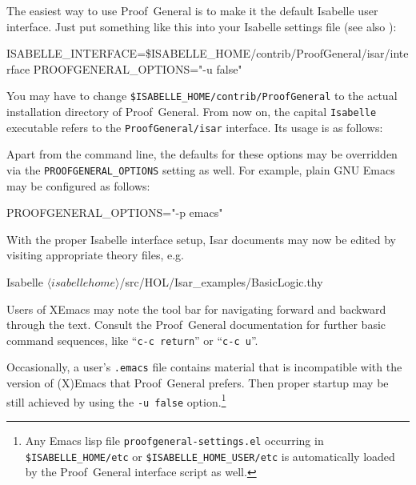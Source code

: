 The easiest way to use Proof~General is to make it the default Isabelle user
interface.  Just put something like this into your Isabelle settings file (see
also \cite{isabelle-sys}):
\begin{ttbox}
ISABELLE_INTERFACE=\$ISABELLE_HOME/contrib/ProofGeneral/isar/interface
PROOFGENERAL_OPTIONS="-u false"
\end{ttbox}
You may have to change \texttt{\$ISABELLE_HOME/contrib/ProofGeneral} to the
actual installation directory of Proof~General.  From now on, the capital
\texttt{Isabelle} executable refers to the \texttt{ProofGeneral/isar}
interface.  Its usage is as follows:
Apart from the command line, the defaults for these options may be overridden
via the \texttt{PROOFGENERAL_OPTIONS} setting as well.  For example, plain GNU
Emacs may be configured as follows:
\begin{ttbox}
PROOFGENERAL_OPTIONS="-p emacs"
\end{ttbox}

With the proper Isabelle interface setup, Isar documents may now be edited by
visiting appropriate theory files, e.g.\ 
\begin{ttbox}
Isabelle \({\langle}isabellehome{\rangle}\)/src/HOL/Isar_examples/BasicLogic.thy
\end{ttbox}
Users of XEmacs may note the tool bar for navigating forward and backward
through the text.  Consult the Proof~General documentation \cite{proofgeneral}
for further basic command sequences, like ``\texttt{c-c return}'' or
``\texttt{c-c u}''.

\medskip

Occasionally, a user's \texttt{.emacs} file contains material that is
incompatible with the version of (X)Emacs that Proof~General prefers.  Then
proper startup may be still achieved by using the \texttt{-u false}
option.\footnote{Any Emacs lisp file \texttt{proofgeneral-settings.el}
  occurring in \texttt{\$ISABELLE_HOME/etc} or
  \texttt{\$ISABELLE_HOME_USER/etc} is automatically loaded by the
  Proof~General interface script as well.}

